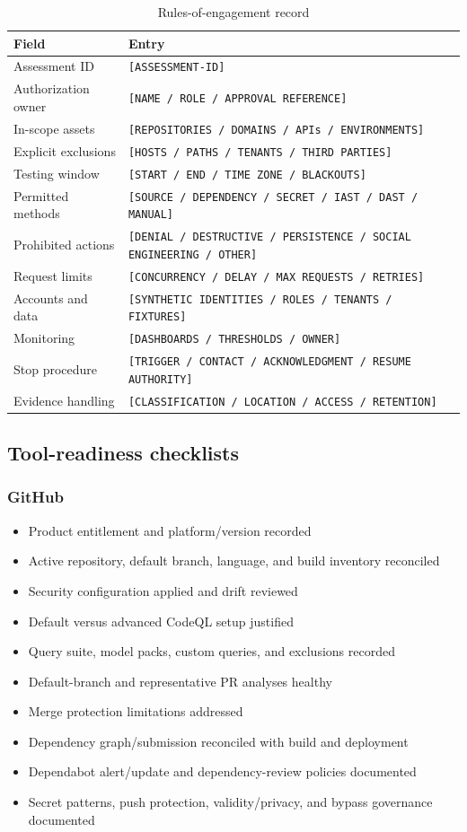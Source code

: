 \documentclass[11pt,letterpaper]{article}
\newcommand{\field}[1]{\texttt{#1}}
\newcommand{\checkitem}{\item[$\square$]}
\begin{document}
\begin{longtable}{@{}L{1.4in}L{5.25in}@{}}
\caption{Rules-of-engagement record}\label{tab:roe-template}\\
\toprule
\textbf{Field} & \textbf{Entry} \\
\midrule
Assessment ID & \field{[ASSESSMENT-ID]} \\
Authorization owner & \field{[NAME / ROLE / APPROVAL REFERENCE]} \\
In-scope assets & \field{[REPOSITORIES / DOMAINS / APIs / ENVIRONMENTS]} \\
Explicit exclusions & \field{[HOSTS / PATHS / TENANTS / THIRD PARTIES]} \\
Testing window & \field{[START / END / TIME ZONE / BLACKOUTS]} \\
Permitted methods & \field{[SOURCE / DEPENDENCY / SECRET / IAST / DAST / MANUAL]} \\
Prohibited actions & \field{[DENIAL / DESTRUCTIVE / PERSISTENCE / SOCIAL ENGINEERING / OTHER]} \\
Request limits & \field{[CONCURRENCY / DELAY / MAX REQUESTS / RETRIES]} \\
Accounts and data & \field{[SYNTHETIC IDENTITIES / ROLES / TENANTS / FIXTURES]} \\
Monitoring & \field{[DASHBOARDS / THRESHOLDS / OWNER]} \\
Stop procedure & \field{[TRIGGER / CONTACT / ACKNOWLEDGMENT / RESUME AUTHORITY]} \\
Evidence handling & \field{[CLASSIFICATION / LOCATION / ACCESS / RETENTION]} \\
\bottomrule
\end{longtable}

\subsection{Tool-readiness checklists}

\subsubsection{GitHub}
\begin{itemize}
  \checkitem Product entitlement and platform/version recorded
  \checkitem Active repository, default branch, language, and build inventory reconciled
  \checkitem Security configuration applied and drift reviewed
  \checkitem Default versus advanced CodeQL setup justified
  \checkitem Query suite, model packs, custom queries, and exclusions recorded
  \checkitem Default-branch and representative PR analyses healthy
  \checkitem Merge protection limitations addressed
  \checkitem Dependency graph/submission reconciled with build and deployment
  \checkitem Dependabot alert/update and dependency-review policies documented
  \checkitem Secret patterns, push protection, validity/privacy, and bypass governance documented
\end{itemize}
\end{document}
